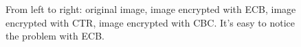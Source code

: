 \begin{figure}[h]
    \centering
    \caption{From left to right: original image, image encrypted with ECB, image encrypted with CTR, image encrypted with CBC. It's easy to notice the problem with ECB.}
\end{figure}

